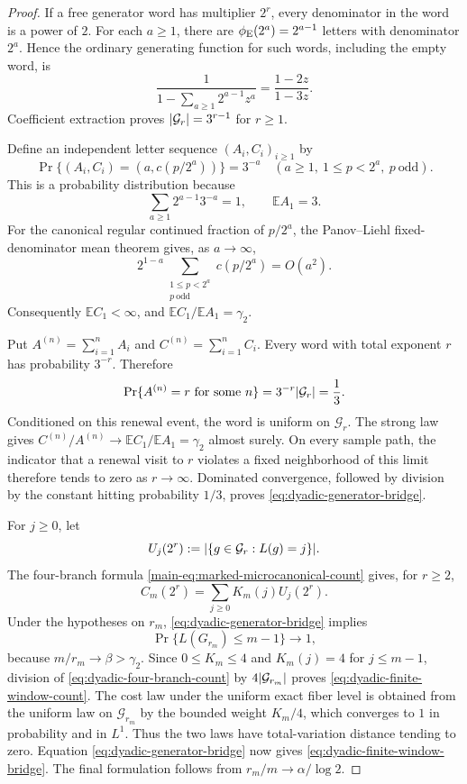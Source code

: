 \begin{proof}
If a free generator word has multiplier \(2^r\), every denominator in the
word is a power of \(2\).  For each \(a\ge1\), there are
\(\phi_{\rm E}(2^a)=2^{a-1}\) letters with denominator \(2^a\).  Hence the
ordinary generating function for such words, including the empty word, is
\[
 \frac1{1-\sum_{a\ge1}2^{a-1}z^a}
 =\frac{1-2z}{1-3z}.
\]
Coefficient extraction proves \(\lvert \mathcal G_r \rvert=3^{r-1}\) for \(r\ge1\).

Define an independent letter sequence \((A_i,C_i)_{i\ge1}\) by
\[
 \Pr\{(A_i,C_i)=(a,c(p/2^a))\}=3^{-a}
 \quad(a\ge1,\ 1\le p<2^a,\ p\ \mathrm{odd}).
\]
This is a probability distribution because
\[
 \sum_{a\ge1}2^{a-1}3^{-a}=1,
 \qquad \mathbb E A_1=3.
\]
For the canonical regular continued fraction of \(p/2^a\), the
Panov--Liehl fixed-denominator mean theorem
\cite{Panov1982,Liehl1983,AistleitnerBordaHauke2023} gives, as \(a\to\infty\),
\[
 2^{1-a}\sum_{\substack{1\le p<2^a\\p\ \mathrm{odd}}}
 c(p/2^a)=O(a^2).
\]
Consequently \(\mathbb E C_1<\infty\), and
\(\mathbb E C_1/\mathbb E A_1=\gamma_2\).

Put \(A^{(n)}=\sum_{i=1}^nA_i\) and
\(C^{(n)}=\sum_{i=1}^nC_i\).  Every word with total exponent \(r\) has
probability \(3^{-r}\).  Therefore
\[
 \Pr\{A^{(n)}=r\text{ for some }n\}
 =3^{-r}\lvert \mathcal G_r \rvert=\frac13.
\]
Conditioned on this renewal event, the word is uniform on \(\mathcal G_r\).
The strong law gives
\(C^{(n)}/A^{(n)}\to\mathbb E C_1/\mathbb E A_1=\gamma_2\) almost surely.
On every sample path, the indicator that a renewal visit to \(r\) violates a
fixed neighborhood of this limit therefore tends to zero as \(r\to\infty\).
Dominated convergence, followed by division by the constant hitting
probability \(1/3\), proves \eqref{eq:dyadic-generator-bridge}.

For \(j\ge0\), let
\[
 U_j(2^r):=\lvert \{g\in\mathcal G_r:L(g)=j\} \rvert.
\]
The four-branch formula \eqref{main-eq:marked-microcanonical-count} gives, for
\(r\ge2\),
\begin{equation}
 C_m(2^r)=\sum_{j\ge0}K_m(j)U_j(2^r).
 \label{eq:dyadic-four-branch-count}
\end{equation}
Under the hypotheses on \(r_m\),
\eqref{eq:dyadic-generator-bridge} implies
\[
 \Pr\{L(G_{r_m})\le m-1\}\longrightarrow1,
\]
because \(m/r_m\to\beta>\gamma_2\).  Since \(0\le K_m\le4\) and
\(K_m(j)=4\) for \(j\le m-1\), division of
\eqref{eq:dyadic-four-branch-count} by \(4\lvert \mathcal G_{r_m} \rvert\) proves
\eqref{eq:dyadic-finite-window-count}.  The cost law under the uniform exact
fiber level is obtained from the uniform law on \(\mathcal G_{r_m}\) by the
bounded weight \(K_m/4\), which converges to \(1\) in probability and in
\(L^1\).  Thus the two laws have total-variation distance tending to zero.
Equation \eqref{eq:dyadic-generator-bridge} now gives
\eqref{eq:dyadic-finite-window-bridge}.  The final formulation follows from
\(r_m/m\to\alpha/\log2\).
\end{proof}

